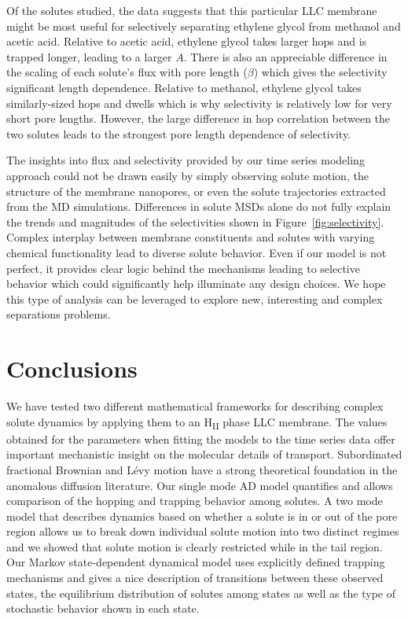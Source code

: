 \documentclass[journal=ancac3,manuscript=article,layout=twocolumn]{achemso}
\begin{document}
  Of the solutes studied, the data suggests that this particular LLC membrane 
  might be most useful for selectively separating ethylene glycol from methanol
  and acetic acid. Relative to acetic acid, ethylene glycol takes larger hops 
  and is trapped longer, leading to a larger $A$. There is also an appreciable 
  difference in the scaling of each solute's flux with pore length ($\beta$) 
  which gives the selectivity significant length dependence. Relative to methanol,
  ethylene glycol takes similarly-sized hops and dwells which is why selectivity
  is relatively low for very short pore lengths. However, the large difference in
  hop correlation between the two solutes leads to the strongest pore length 
  dependence of selectivity. 
  
  The insights into flux and selectivity provided by our time series modeling
  approach could not be drawn easily by simply observing solute motion, the
  structure of the membrane nanopores, or even the solute trajectories
  extracted from the MD simulations. Differences in solute MSDs alone do not
  fully explain the trends and magnitudes of the selectivities shown in
  Figure~\ref{fig:selectivity}. Complex interplay between membrane
  constituents and solutes with varying chemical functionality lead to diverse
  solute behavior. Even if our model is not perfect, it provides clear logic
  behind the mechanisms leading to selective behavior which could significantly
  help illuminate any design choices. We hope this type of analysis can be 
  leveraged to explore new, interesting and complex separations problems.
  
  \section{Conclusions}
  
  We have tested two different mathematical frameworks for
  describing complex solute dynamics
  by applying them to an H\textsubscript{II} phase LLC membrane. The
  values obtained for the parameters when fitting the models to the time series
  data offer important mechanistic insight on the molecular details of
  transport. Subordinated fractional Brownian and L\'evy motion have a strong
  theoretical foundation in the anomalous diffusion literature. Our single mode
  AD model quantifies and allows comparison of the hopping and trapping behavior
  among solutes. A two mode model that describes dynamics based on whether a
  solute is in or out of the pore region allows us to break down individual
  solute motion into two distinct regimes and we showed that solute motion
  is clearly restricted while in the tail region. Our Markov state-dependent
  dynamical model uses explicitly defined trapping mechanisms and gives a nice
  description of transitions between these observed states, the equilibrium
  distribution of solutes among states as well as the type of stochastic
  behavior shown in each state. 
  
\end{document}
